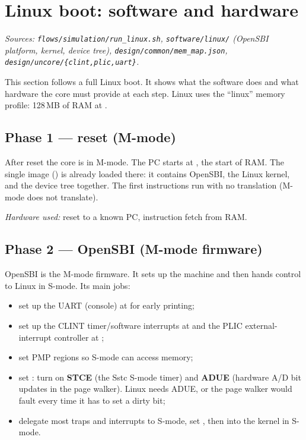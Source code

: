 \section{Linux boot: software and hardware}
\textit{Sources: \texttt{flows/simulation/run\_linux.sh},
\texttt{software/linux/} (OpenSBI platform, kernel, device tree),
\texttt{design/common/mem\_map.json}, \texttt{design/uncore/\{clint,plic,uart\}}.}

This section follows a full Linux boot. It shows what the software does and what
hardware the core must provide at each step. Linux uses the ``linux'' memory
profile: 128\,MB of RAM at .


\subsection{Phase 1 --- reset (M-mode)}
After reset the core is in M-mode. The PC starts at , the start
of RAM. The single image () is already loaded there: it contains
OpenSBI, the Linux kernel, and the device tree together. The first instructions
run with no translation (M-mode does not translate).

\emph{Hardware used:} reset to a known PC, instruction fetch from RAM.

\subsection{Phase 2 --- OpenSBI (M-mode firmware)}
OpenSBI is the M-mode firmware. It sets up the machine and then hands control to
Linux in S-mode. Its main jobs:
\begin{itemize}[leftmargin=1.4em,itemsep=1pt]
\item set up the UART (console) at  for early printing;
\item set up the CLINT timer/software interrupts at  and the
  PLIC external-interrupt controller at ;
\item set PMP regions so S-mode can access memory;
\item set : turn on \textbf{STCE} (the Sstc S-mode timer) and
  \textbf{ADUE} (hardware A/D bit updates in the page walker). Linux needs ADUE,
  or the page walker would fault every time it has to set a dirty bit;
\item delegate most traps and interrupts to S-mode, set , then
   into the kernel in S-mode.
\end{itemize}

